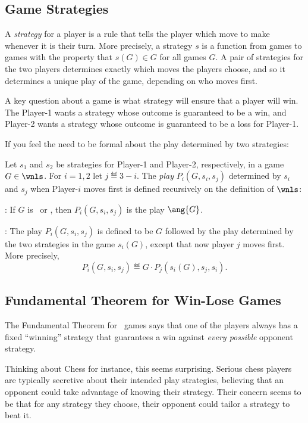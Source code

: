 \begin{definition}
\subsection{Game Strategies}

A \emph{strategy} for a player is a rule that tells the player which
move to make whenever it is their turn.  More precisely, a strategy
$s$ is a function from games to games with the property that $s(G) \in
G$ for all games $G$.  A pair of strategies for the two players
determines exactly which moves the players choose, and so it
determines a unique play of the game, depending on who moves first.

A key question about a game is what strategy will ensure that a player
will win.  The Player-1 wants a strategy whose outcome is guaranteed
to be a win, and Player-2 wants a strategy whose outcome is guaranteed
to be a loss for Player-1. 

\begin{staffnotes}
If you feel the need to be formal about the play determined by two
strategies:
\begin{definition*}
Let $s_1$ and $s_2$ be strategies for Player-1 and Player-2,
respectively, in a game $G \in \wnls$.  For $i=1,2$ let $j \eqdef
3-i$.  The \emph{play} $P_i(G,s_i,s_j)$ determined by $s_i$ and $s_j$
when Player-$i$ moves first is defined recursively on the definition
of $\wnls$:

: If $G$ is \winend\ or \loseend, then
$P_i(G,s_i,s_j)$ is the play $\ang{G}$.

: The play $P_i(G,s_i,s_j)$ is defined
to be $G$ followed by the play determined by the two strategies in the
game $s_i(G)$, except that now player $j$ moves first.  More
precisely,
\[
P_i(G,s_i,s_j) \eqdef G \cdot P_j(s_i(G),s_j,s_i).
\]
\end{definition*}
\end{staffnotes}

\subsection{Fundamental Theorem for Win-Lose Games}\label{FundThm_Games}

The Fundamental Theorem for \wnls\ games says that one of the players
always has a fixed ``winning'' strategy that guarantees a win against
\emph{every possible} opponent strategy.

Thinking about Chess for instance, this seems surprising.  Serious
chess players are typically secretive about their intended play
strategies, believing that an opponent could take advantage of knowing
their strategy.  Their concern seems to be that for any strategy they
choose, their opponent could tailor a strategy to beat it.


\end{definition}
